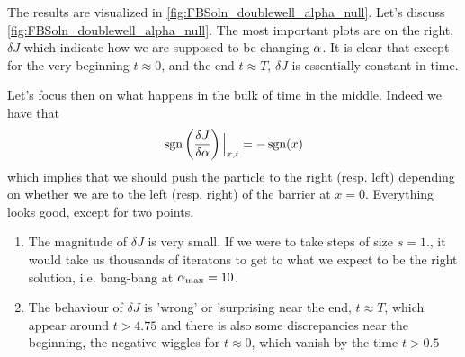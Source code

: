 \documentclass{article}
\begin{document}
The results are visualized in \cref{fig:FBSoln_doublewell_alpha_null}. Let's
discuss \cref{fig:FBSoln_doublewell_alpha_null}. The most important plots are on
the right, $\delta J$ which indicate how we are supposed to be changing ${\alpha}$. 
It is clear that except for the very beginning $t \approx 0$, and the end $t
\approx T$, $\delta J$ is essentially constant in time.  

Let's focus then on what happens in the bulk of time in the middle. Indeed we  
have that 
$$
\operatorname{sgn} \left(\frac {\delta J}{\delta {\alpha}}\right) \Big|_{x,t} = - \operatorname{sgn}(x)
$$
which implies that we should push the particle to the right (resp. left)
depending on whether we are to the left (resp. right) of the barrier at $x=0$.
Everything looks good, except for two points.
\begin{enumerate}
  \item The magnitude of $\delta J$ is very small. If we were to take steps of
  size $s=1.$, it would take us thousands of iteratons to get to what we expect to be
the right solution, i.e. bang-bang at ${ {\alpha}_{\textrm{max}} } = 10$.
\item The behaviour of $\delta J$ is 'wrong' or 'surprising near the end, $t
\approx T$, which appear around $t>4.75$ and there is also some discrepancies
near the beginning, the negative wiggles for $t \approx 0$, which vanish by the
time $t > 0.5$
\end{enumerate}
\end{document}
